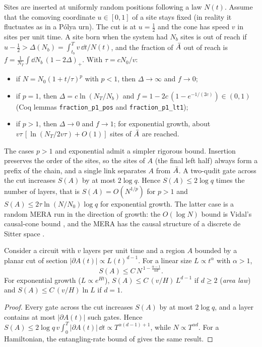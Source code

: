 \begin{estimate}\label{est:homog}
Sites are inserted at uniformly random positions following a law $N(t)$. Assume that the comoving coordinate $u\in[0,1]$ of a site stays fixed (in reality it fluctuates as in a P\'olya urn). The cut is at $u=\frac12$ and the cone has speed $v$ in sites per unit time. A site born when the system had $N_b$ sites is out of reach if $u-\frac12>\Delta(N_b)=\int_{t_b}^Tv\,\dd t/N(t)$, and the fraction of $\bar A$ out of reach is $f=\frac{1}{N_T}\int\dd N_b\,(1-2\Delta)_+$. With $\tau=cN_0/v$:
\begin{itemize}[leftmargin=*,itemsep=1pt]
\item if $N=N_0(1+t/\tau)^{p}$ with $p<1$, then $\Delta\to\infty$ and $f\to0$;
\item if $p=1$, then $\Delta=c\ln(N_T/N_b)$ and $f=1-2c\,(1-e^{-1/(2c)})\in(0,1)$ (Coq lemmas \texttt{fraction\_p1\_pos} and \texttt{fraction\_p1\_lt1});
\item if $p>1$, then $\Delta\to0$ and $f\to1$; for exponential growth, about $v\tau\,[\ln(N_T/2v\tau)+O(1)]$ sites of $\bar A$ are reached.
\end{itemize}
\end{estimate}

The cases $p>1$ and exponential admit a simpler rigorous bound. Insertion preserves the order of the sites, so the sites of $A$ (the final left half) always form a prefix of the chain, and a single link separates $A$ from $\bar A$. A two-qudit gate across the cut increases $S(A)$ by at most $2\log q$. Hence $S(A)\le2\log q$ times the number of layers, that is $S(A)=O(N^{1/p})$ for $p>1$ and $S(A)\le2\tau\ln(N/N_0)\log q$ for exponential growth. The latter case is a random MERA run in the direction of growth: the $O(\log N)$ bound is Vidal's causal-cone bound \cite{Vidal2007,Vidal2008}, and the MERA has the causal structure of a discrete de Sitter space \cite{Beny2013,BaoDS2017}.

\begin{proposition}\label{prop:scaling}
Consider a circuit with $v$ layers per unit time and a region $A$ bounded by a planar cut of section $|\partial A(t)|\propto L(t)^{d-1}$. For a linear size $L\propto t^\alpha$ with $\alpha>1$,
\begin{equation}\label{eq:scaling}
S(A)\le C\,N^{\,1-\frac{\alpha-1}{\alpha d}} .
\end{equation}
For exponential growth ($L\propto e^{Ht}$), $S(A)\le C\,(v/H)\,L^{d-1}$ if $d\ge2$ (\emph{area law}) and $S(A)\le C\,(v/H)\ln L$ if $d=1$.
\end{proposition}
\begin{proof}
Every gate across the cut increases $S(A)$ by at most $2\log q$, and a layer contains at most $|\partial A(t)|$ such gates. Hence $S(A)\le2\log q\,v\int_0^T|\partial A(t)|\,\dd t\propto T^{\alpha(d-1)+1}$, while $N\propto T^{\alpha d}$. For a Hamiltonian, the entangling-rate bound of \cite{VanAcoleyen2013,Marien2016} gives the same result.
\end{proof}

